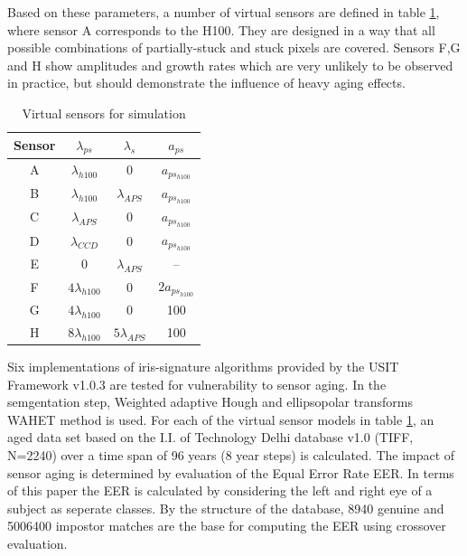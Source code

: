 \documentclass[10pt,twocolumn,letterpaper]{article}
\begin{document}
\egroup

  Based on these parameters, a number of virtual sensors are defined in table \ref{table:tests}, where sensor A corresponds to the H100. They are designed in a way that all possible combinations of partially-stuck and stuck pixels are covered. Sensors F,G and H show amplitudes and growth rates which are very unlikely to be observed in practice, but should demonstrate the influence of heavy aging effects. 
 
 \begin{table}[bt]  
  \begin{center}

  \begin{tabular}{c | c c c }
  Sensor & $\lambda_{ps}$ & $\lambda_{s}$ & $a_{ps}$  \\
  \hline
  A	&	$\lambda_{h100}$ & 0 & $a_{ps_{h100}}$ \\
  B & $\lambda_{h100}$ & $\lambda_{APS}$ & $a_{ps_{h100}}$ \\
  C & $\lambda_{APS}$ & 0 & $a_{ps_{h100}}$    \\
  D & $\lambda_{CCD}$ & 0 & $a_{ps_{h100}}$   \\
  E & 0 & $\lambda_{APS}$ & -- \\
  F & $ 4 \lambda_{h100}$ & 0 & $ 2 a_{ps_{h100}}$ \\
  G & $ 4 \lambda_{h100}$ & 0 & 100 \\
  H & $ 8 \lambda_{h100}$ &  $ 5 \lambda_{APS}$ & 100

  \end{tabular}
    
    \vspace{3mm}
    \caption{Virtual sensors for simulation}
    \label{table:tests}
  \end{center}
 \end{table}
  
  Six implementations \cite{Ma, Monro, ko, cb, lg, rathgeb} of iris-signature algorithms provided by the USIT Framework v1.0.3 are tested for vulnerability to sensor aging. In the semgentation step, Weighted adaptive Hough and ellipsopolar transforms WAHET method \cite{wahet} is used. For each of the virtual sensor models in table \ref{table:tests}, an aged data set based on the I.I. of Technology Delhi database v1.0 (TIFF, N=2240) over a time span of 96 years (8 year steps) is calculated. The impact of sensor aging is determined by evaluation of the Equal Error Rate EER. In terms of this paper the EER is calculated by considering the left and right eye of a subject as seperate classes. By the structure of the database, 8940 genuine and 5006400 impostor matches are the base for computing the EER using crossover evaluation.
  
\end{document}
